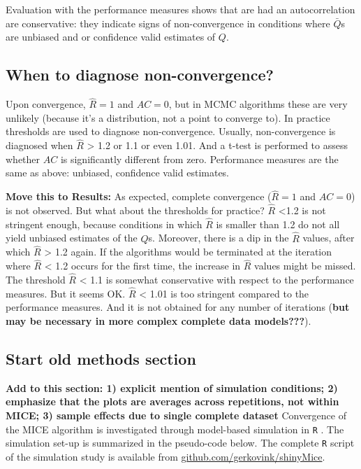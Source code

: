 \documentclass[Royal,times,sageh]{sagej}
\begin{document}
Evaluation with the performance measures shows that are had an
autocorrelation are conservative: they indicate signs of non-convergence
in conditions where \(\bar{Q}\)s are unbiased and or confidence valid
estimates of \(Q\).

\hypertarget{when-to-diagnose-non-convergence}{%
\subsection{When to diagnose
non-convergence?}\label{when-to-diagnose-non-convergence}}

Upon convergence, \(\widehat{R}=1\) and \(AC=0\), but in MCMC algorithms
these are very unlikely (because it's a distribution, not a point to
converge to). In practice thresholds are used to diagnose
non-convergence. Usually, non-convergence is diagnosed when
\(\widehat{R}\) \textgreater{} 1.2 or 1.1 or even 1.01. And a t-test is
performed to assess whether \(AC\) is significantly different from zero.
Performance measures are the same as above: unbiased, confidence valid
estimates.

\textbf{Move this to Results:} As expected, complete convergence
(\(\widehat{R}=1\) and \(AC=0\)) is not observed. But what about the
thresholds for practice? \(\widehat{R}\) \textless1.2 is not stringent
enough, because conditions in which \(\widehat{R}\) is smaller than 1.2
do not all yield unbiased estimates of the \(Q\)s. Moreover, there is a
dip in the \(\widehat{R}\) values, after which \(\widehat{R}\)
\textgreater{} 1.2 again. If the algorithms would be terminated at the
iteration where \(\widehat{R}\) \textless{} 1.2 occurs for the first
time, the increase in \(\widehat{R}\) values might be missed. The
threshold \(\widehat{R}\) \textless{} 1.1 is somewhat conservative with
respect to the performance measures. But it seems OK. \(\widehat{R}\)
\textless{} 1.01 is too stringent compared to the performance measures.
And it is not obtained for any number of iterations (\textbf{but may be
necessary in more complex complete data models???}).

\hypertarget{start-old-methods-section}{%
\subsection{Start old methods section}\label{start-old-methods-section}}

\textbf{Add to this section: 1) explicit mention of simulation
conditions; 2) emphasize that the plots are averages across repetitions,
not within MICE; 3) sample effects due to single complete dataset}
Convergence of the MICE algorithm is investigated through model-based
simulation in \texttt{R} \citep[version 3.6.3;][]{R}. The simulation
set-up is summarized in the pseudo-code below. The complete \texttt{R}
script of the simulation study is available from
\href{https://github.com/gerkovink/shinyMice/tree/master/3.Thesis/1.SimulationStudy}{github.com/gerkovink/shinyMice}.
\end{document}
